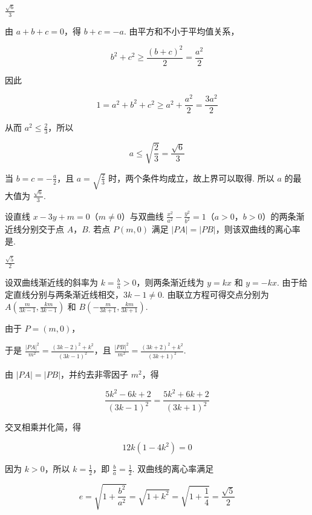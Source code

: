 \begin{answer}
\(\frac{\sqrt{6}}{3}\)
\end{answer}

\begin{solution}
由 \(a+b+c=0\)，得 \(b+c=-a\). 由平方和不小于平均值关系，

\[
b^{2}+c^{2}\geqslant\frac{(b+c)^{2}}{2}=\frac{a^{2}}{2}
\]

因此

\[
1=a^{2}+b^{2}+c^{2}\geqslant a^{2}+\frac{a^{2}}{2}=\frac{3a^{2}}{2}
\]

从而 \(a^{2}\leqslant\frac{2}{3}\)，所以

\[
a\leqslant\sqrt{\frac{2}{3}}=\frac{\sqrt{6}}{3}
\]

当 \(b=c=-\frac{a}{2}\)，且 \(a=\sqrt{\frac{2}{3}}\) 时，两个条件均成立，故上界可以取得. 所以 \(a\) 的最大值为 \(\frac{\sqrt{6}}{3}\).
\end{solution}

\begin{problem}
设直线 \(x - 3y + m = 0\)（\(m \neq 0\)）与双曲线 \(\frac{x^2}{a^2} - \frac{y^2}{b^2} = 1\)（\(a > 0\)，\(b > 0\)）的两条渐近线分别交于点 \(A\)，\(B\). 若点 \(P(m, 0)\) 满足 \(|PA| = |PB|\)，则该双曲线的离心率是\fillinblank{}.
\end{problem}

\begin{answer}
\(\frac{\sqrt{5}}{2}\)
\end{answer}

\begin{solution}
设双曲线渐近线的斜率为 \(k=\frac{b}{a}>0\)，则两条渐近线为 \(y=kx\) 和 \(y=-kx\). 由于给定直线分别与两条渐近线相交，\(3k-1\ne0\). 由联立方程可得交点分别为 \(A\left(\frac{m}{3k-1},\frac{km}{3k-1}\right)\) 和 \(B\left(-\frac{m}{3k+1},\frac{km}{3k+1}\right)\).

由于 \(P=(m,0)\)，

于是 \(\frac{|PA|^{2}}{m^{2}}=\frac{(3k-2)^{2}+k^{2}}{(3k-1)^{2}}\)，且 \(\frac{|PB|^{2}}{m^{2}}=\frac{(3k+2)^{2}+k^{2}}{(3k+1)^{2}}\).

由 \(|PA|=|PB|\)，并约去非零因子 \(m^{2}\)，得

\[
\frac{5k^{2}-6k+2}{(3k-1)^{2}}=\frac{5k^{2}+6k+2}{(3k+1)^{2}}
\]

交叉相乘并化简，得

\[
12k(1-4k^{2})=0
\]

因为 \(k>0\)，所以 \(k=\frac{1}{2}\)，即 \(\frac{b}{a}=\frac{1}{2}\). 双曲线的离心率满足

\[
e=\sqrt{1+\frac{b^{2}}{a^{2}}}=\sqrt{1+k^{2}}=\sqrt{1+\frac14}=\frac{\sqrt{5}}{2}
\]
\end{solution}


